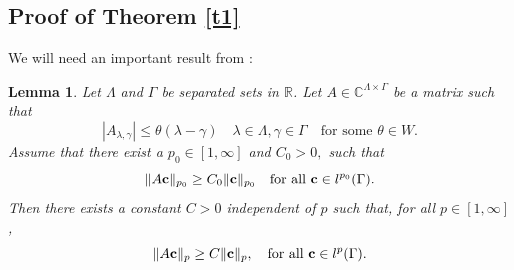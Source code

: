 \documentclass[12pt]{amsart}
\numberwithin{equation}{section}
\newtheorem{lemma}[theorem]{Lemma}
\newcommand{\R}{{\mathbb R}} \newcommand{\Q}{{\mathbb Q}} \newcommand{\Z}{{\mathbb Z}} \newcommand{\N}{{\mathbb N}}
\newcommand{\Cc}{{\mathbb C}}\newcommand{\cc}{{\bf c}} \newcommand{\ab}{{\bf a}} \newcommand{\xx}{{\bf x}} \newcommand{\yy}{{\bf y}}\newcommand{\uu}{{\bf u}}
\begin{document}
 


\subsection{Proof of Theorem \ref{t1}} 


We will need an important result from \cite{MR3336091}:
\begin{lemma}\label{spec_invar}
  Let $\Lambda$ and $\Gamma$ be separated sets in $\R$. Let $A \in \Cc^{\Lambda \times \Gamma}$ be a matrix such that
  \begin{equation}\label{conv_domin}
        |A_{\lambda, \gamma}| \le \theta(\lambda - \gamma) \quad \lambda \in \Lambda, \gamma \in \Gamma \quad \text{for some  } \theta \in W.
  \end{equation}
  Assume that there exist a $p_0 \in [1,\infty]$ and $C_0 > 0,$ such that
\begin{equation}\label{e00}\|A\cc\|_{p_0} \geq  C_0\|\cc\|_{p_0}\quad \mbox{for all } \cc\in l^{p_0}(\Gamma).\end{equation}
Then there exists a constant $C > 0$ independent of $p$ such that, for all $p \in [1,\infty]$,
\begin{equation}\label{e01}\|A\cc\|_p \geq C\|\cc\|_p,\quad \mbox{for all } \cc\in l^p(\Gamma).\end{equation}
\end{lemma}
\end{document}
